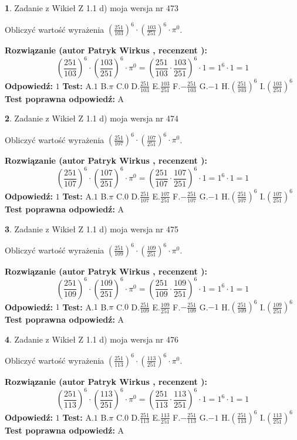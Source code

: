 \documentclass[12pt, a4paper]{article}
\theoremstyle{definition} %
\newtheorem{zad}{}
\newcommand{\zadStart}[1]{\begin{zad}#1\newline}
\newcommand{\zadStop}{\end{zad}}
\newcommand{\rozwStart}[2]{\noindent \textbf{Rozwiązanie (autor #1 , recenzent #2): }\newline}
\newcommand{\rozwStop}{\newline}
\newcommand{\odpStart}{\noindent \textbf{Odpowiedź:}\newline}
\newcommand{\odpStop}{\newline}
\newcommand{\testStart}{\noindent \textbf{Test:}\newline}
\newcommand{\testStop}{\newline}
\newcommand{\kluczStart}{\noindent \textbf{Test poprawna odpowiedź:}\newline}
\newcommand{\kluczStop}{\newline}
\begin{document}
\zadStart{Zadanie z Wikieł Z 1.1 d) moja wersja nr 473}

Obliczyć wartość wyrażenia $(\frac{251}{103})^{6} \cdot (\frac{103}{251})^{6} \cdot \pi^{0}$.
\zadStop
\rozwStart{Patryk Wirkus}{}
$$(\frac{251}{103})^{6} \cdot (\frac{103}{251})^{6} \cdot \pi^{0} = (\frac{251}{103} \cdot \frac{103}{251})^{6} \cdot 1 = 1^{6} \cdot 1 = 1$$
\rozwStop
\odpStart
$1$
\odpStop
\testStart
A.$1$ B.$\pi$ C.$0$ D.$\frac{251}{103}$ E.$\frac{103}{251}$
F.$-\frac{251}{103}$ G.$-1$
H.$(\frac{251}{103})^{6}$
I.$(\frac{103}{251})^{6}$
\testStop
\kluczStart
A
\kluczStop



\zadStart{Zadanie z Wikieł Z 1.1 d) moja wersja nr 474}

Obliczyć wartość wyrażenia $(\frac{251}{107})^{6} \cdot (\frac{107}{251})^{6} \cdot \pi^{0}$.
\zadStop
\rozwStart{Patryk Wirkus}{}
$$(\frac{251}{107})^{6} \cdot (\frac{107}{251})^{6} \cdot \pi^{0} = (\frac{251}{107} \cdot \frac{107}{251})^{6} \cdot 1 = 1^{6} \cdot 1 = 1$$
\rozwStop
\odpStart
$1$
\odpStop
\testStart
A.$1$ B.$\pi$ C.$0$ D.$\frac{251}{107}$ E.$\frac{107}{251}$
F.$-\frac{251}{107}$ G.$-1$
H.$(\frac{251}{107})^{6}$
I.$(\frac{107}{251})^{6}$
\testStop
\kluczStart
A
\kluczStop



\zadStart{Zadanie z Wikieł Z 1.1 d) moja wersja nr 475}

Obliczyć wartość wyrażenia $(\frac{251}{109})^{6} \cdot (\frac{109}{251})^{6} \cdot \pi^{0}$.
\zadStop
\rozwStart{Patryk Wirkus}{}
$$(\frac{251}{109})^{6} \cdot (\frac{109}{251})^{6} \cdot \pi^{0} = (\frac{251}{109} \cdot \frac{109}{251})^{6} \cdot 1 = 1^{6} \cdot 1 = 1$$
\rozwStop
\odpStart
$1$
\odpStop
\testStart
A.$1$ B.$\pi$ C.$0$ D.$\frac{251}{109}$ E.$\frac{109}{251}$
F.$-\frac{251}{109}$ G.$-1$
H.$(\frac{251}{109})^{6}$
I.$(\frac{109}{251})^{6}$
\testStop
\kluczStart
A
\kluczStop



\zadStart{Zadanie z Wikieł Z 1.1 d) moja wersja nr 476}

Obliczyć wartość wyrażenia $(\frac{251}{113})^{6} \cdot (\frac{113}{251})^{6} \cdot \pi^{0}$.
\zadStop
\rozwStart{Patryk Wirkus}{}
$$(\frac{251}{113})^{6} \cdot (\frac{113}{251})^{6} \cdot \pi^{0} = (\frac{251}{113} \cdot \frac{113}{251})^{6} \cdot 1 = 1^{6} \cdot 1 = 1$$
\rozwStop
\odpStart
$1$
\odpStop
\testStart
A.$1$ B.$\pi$ C.$0$ D.$\frac{251}{113}$ E.$\frac{113}{251}$
F.$-\frac{251}{113}$ G.$-1$
H.$(\frac{251}{113})^{6}$
I.$(\frac{113}{251})^{6}$
\testStop
\kluczStart
A
\kluczStop
\end{document}
